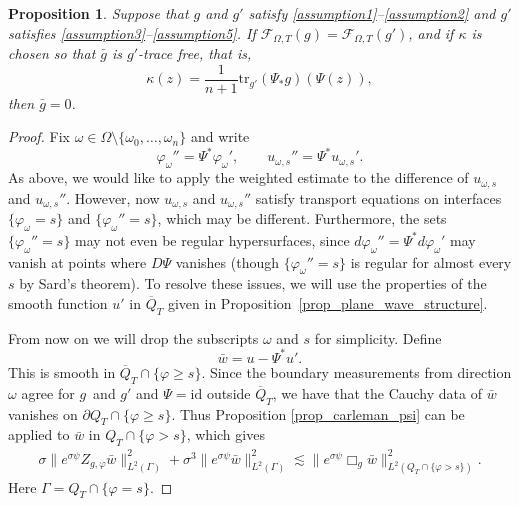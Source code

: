 \documentclass[11pt,letterpaper]{amsart}
\newtheorem{Proposition}[Theorem]{Proposition}
\theoremstyle{definition}
\numberwithin{equation}{section}
\newcommand{\norm}[1]{\lVert #1 \rVert}         %
\newcommand{\ol}[1]{\overline{#1}}
\newcommand{\id}{\mathrm{id}}
\newcommand{\p}{\partial}
\def\p{\partial}
\begin{document}
\begin{Proposition} \label{prop_gbar_zero}
Suppose that $g$ and $g'$ satisfy \eqref{assumption1}--\eqref{assumption2} and $g'$ satisfies \eqref{assumption3}--\eqref{assumption5}. If $\mathcal{F}_{\Omega,T}(g) = \mathcal{F}_{\Omega,T}(g')$, and if $\kappa$ is chosen so that $\bar{g}$ is $g'$-trace free, that is, 
\[
\kappa(z) = \frac{1}{n+1} \mathrm{tr}_{g'}(\Psi_* g)(\Psi(z)),
\]
then $\bar{g} = 0$.
\end{Proposition}
\begin{proof}
Fix $\omega \in \Omega \setminus \{ \omega_0, \ldots, \omega_n \}$ and write 
\[
\varphi_{\omega}'' = \Psi^* \varphi_{\omega}', \qquad u_{\omega,s}'' = \Psi^* u_{\omega,s}'.
\]
As above, we would like to apply the weighted estimate to the difference of $u_{\omega,s}$ and $u_{\omega,s}''$. However, now $u_{\omega,s}$ and $u_{\omega,s}''$ satisfy transport equations on interfaces $\{ \varphi_{\omega} = s \}$ and $\{ \varphi_{\omega}'' = s \}$, which may be different. Furthermore, the sets $\{ \varphi_{\omega}'' = s \}$ may not even be regular hypersurfaces, since $d \varphi_{\omega}'' = \Psi^* d \varphi_{\omega}'$ may vanish at points where $D\Psi$ vanishes (though $\{ \varphi_{\omega}'' = s \}$ is regular for almost every $s$ by Sard's theorem). To resolve these issues, we will use the properties of the smooth function $u'$ in $\ol{Q}_T$ given in Proposition~\ref{prop_plane_wave_structure}.

From now on we will drop the subscripts $\omega$ and $s$ for simplicity.  Define 
\[
\bar{w} = u - \Psi^* u'.
\]
This is smooth in $\ol{Q}_T \cap \{ \varphi \geq s \}$. Since the boundary measurements from direction $\omega$ agree for $g$ and $g'$ and $\Psi = \id$ outside $\ol{Q}_T$, we have that the Cauchy data of $\bar{w}$ vanishes on $\p Q_T \cap \{ \varphi \geq s \}$. Thus Proposition \ref{prop_carleman_psi} can be applied to $\bar{w}$ in $Q_T \cap \{ \varphi > s \}$, which gives 
\begin{gather} \label{barwomegas_carleman_estimate}
\sigma \norm{e^{\sigma \psi} Z_{g,\varphi} \bar{w}}_{L^2(\Gamma)}^2 + \sigma^3 \norm{e^{\sigma \psi} \bar{w}}_{L^2(\Gamma)}^2 
 \lesssim \norm{e^{\sigma \psi} \Box_g \bar{w}}_{L^2(Q_T \cap \{ \varphi > s \})}^2.
\end{gather}
Here $\Gamma = Q_T \cap \{ \varphi = s \}$.


\end{proof}
\end{document}

